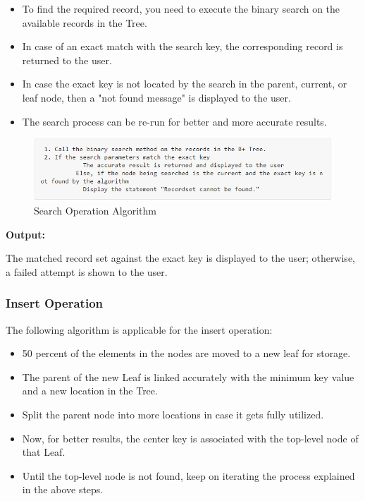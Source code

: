 \documentclass[11pt, a4paper]{article}
\begin{document}
\begin{itemize}
    \item To find the required record, you need to execute the binary search on the available records in the Tree.
    \item In case of an exact match with the search key, the corresponding record is returned to the user.
    \item In case the exact key is not located by the search in the parent, current, or leaf node, then a "not found message" is displayed to the user.
    \item The search process can be re-run for better and more accurate results.
\end{itemize}

\begin{figure}[h]
    \centering
    \includegraphics{search.png}
    \caption{Search Operation Algorithm}
    \label{Search}
\end{figure}

\noindent \textbf{Output:}

\noindent The matched record set against the exact key is displayed to the user; otherwise, a failed attempt is shown to the user.

\subsubsection{Insert Operation}

\noindent The following algorithm is applicable for the insert operation:

\begin{itemize}
    \item 50 percent of the elements in the nodes are moved to a new leaf for storage.
    \item The parent of the new Leaf is linked accurately with the minimum key value and a new location in the Tree.
    \item Split the parent node into more locations in case it gets fully utilized.
    \item Now, for better results, the center key is associated with the top-level node of that Leaf.
    \item Until the top-level node is not found, keep on iterating the process explained in the above steps.
\end{itemize}
\end{document}
